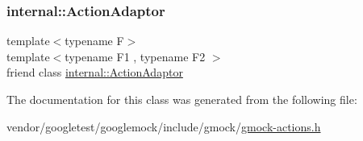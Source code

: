 \subsubsection{\texorpdfstring{internal\+::\+Action\+Adaptor}{internal::ActionAdaptor}}
{\footnotesize\ttfamily template$<$typename F$>$ \\
template$<$typename F1 , typename F2 $>$ \\
friend class \hyperlink{classtesting_1_1internal_1_1_action_adaptor}{internal\+::\+Action\+Adaptor}\hspace{0.3cm}{\ttfamily [friend]}}



The documentation for this class was generated from the following file\+:\begin{DoxyCompactItemize}
\item 
vendor/googletest/googlemock/include/gmock/\hyperlink{gmock-actions_8h}{gmock-\/actions.\+h}\end{DoxyCompactItemize}
